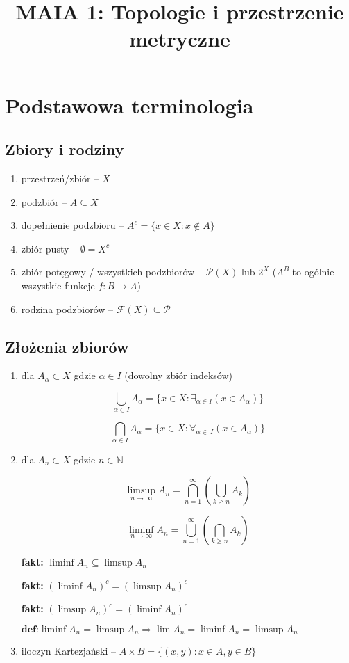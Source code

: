 \documentclass{article}
\title{MAIA 1: Topologie i przestrzenie metryczne}
\author{}
\date{}
\begin{document}
\maketitle

\section{Podstawowa terminologia}

\subsection{Zbiory i rodziny}

\begin{enumerate}

\item przestrzeń/zbiór -- $X$
\item podzbiór -- $A \subseteq X$
\item dopełnienie podzbioru -- $A^c = \{x \in X : x \notin A\}$
\item zbiór pusty -- $\emptyset = X^c$
\item zbiór potęgowy / wszystkich podzbiorów -- $\mathcal{P}(X)$ lub $2^X$ ($A^B$ to ogólnie wszystkie funkcje $f: B \to A$)
\item rodzina podzbiorów -- $\mathcal{F}(X) \subseteq \mathcal{P}$

\end{enumerate}


\subsection{Złożenia zbiorów}

\begin{enumerate}

\item dla $A_\alpha \subset X$ gdzie $\alpha \in I$ (dowolny zbiór indeksów)

$$\bigcup_{\alpha \in I} A_\alpha = \{x \in X: \exists_{\alpha\in I}(x \in A_\alpha)\}$$

$$\bigcap_{\alpha \in I} A_\alpha = \{x \in X: \forall_{\alpha \in\ I}(x \in A_\alpha)\}$$

\item dla $A_n \subset X$ gdzie $n \in \mathbb{N}$

$$\limsup_{n \to \infty} A_n = \bigcap_{n=1}^{\infty} \left( \bigcup_{k \geq n} A_k \right)$$

$$\liminf_{n \to \infty} A_n = \bigcup_{n=1}^{\infty} \left( \bigcap_{k \geq n} A_k \right)$$

\textbf{fakt:} $\liminf A_n \subseteq \limsup A_n$

\textbf{fakt:} $\left( \liminf A_n \right)^c = \left( \limsup A_n\right)^c$

\textbf{fakt:} $\left( \limsup A_n \right)^c = \left( \liminf A_n\right)^c$

$\textbf{def:} \liminf A_n = \limsup A_n \Rightarrow \lim A_n = \liminf A_n = \limsup A_n$

\item iloczyn Kartezjański -- $A \times B = \{(x,y): x \in A, y \in B \}$

\end{enumerate}
\end{document}
